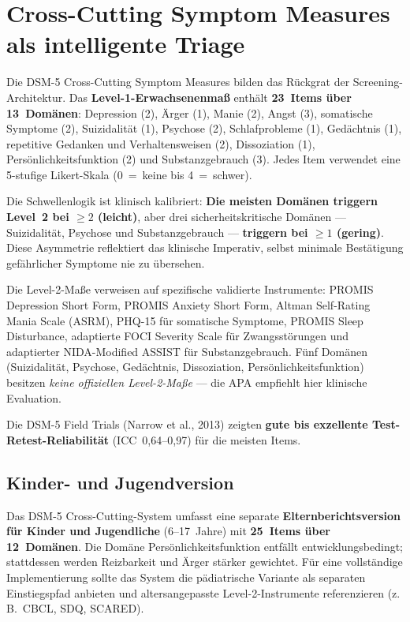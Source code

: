 \documentclass[11pt,a4paper]{article}
\begin{document}
\section{Cross-Cutting Symptom Measures als intelligente Triage}
\label{sec:screening}

Die DSM-5 Cross-Cutting Symptom Measures bilden das R\"uckgrat der Screening-Architektur. Das \textbf{Level-1-Erwachsenenma\ss{}} enth\"alt \textbf{23~Items \"uber 13~Dom\"anen}: Depression (2), \"Arger (1), Manie (2), Angst (3), somatische Symptome (2), Suizidalit\"at (1), Psychose (2), Schlafprobleme (1), Ged\"achtnis (1), repetitive Gedanken und Verhaltensweisen (2), Dissoziation (1), Pers\"onlichkeitsfunktion (2) und Substanzgebrauch (3). Jedes Item verwendet eine 5-stufige Likert-Skala (0~=~keine bis 4~=~schwer).

Die Schwellenlogik ist klinisch kalibriert: \textbf{Die meisten Dom\"anen triggern Level~2 bei $\geq 2$ (leicht)}, aber drei sicherheitskritische Dom\"anen --- Suizidalit\"at, Psychose und Substanzgebrauch --- \textbf{triggern bei $\geq 1$ (gering)}. Diese Asymmetrie reflektiert das klinische Imperativ, selbst minimale Best\"atigung gef\"ahrlicher Symptome nie zu \"ubersehen.

Die Level-2-Ma\ss{}e verweisen auf spezifische validierte Instrumente: PROMIS Depression Short Form, PROMIS Anxiety Short Form, Altman Self-Rating Mania Scale (ASRM), PHQ-15 f\"ur somatische Symptome, PROMIS Sleep Disturbance, adaptierte FOCI Severity Scale f\"ur Zwangsst\"orungen und adaptierter NIDA-Modified ASSIST f\"ur Substanzgebrauch. F\"unf Dom\"anen (Suizidalit\"at, Psychose, Ged\"achtnis, Dissoziation, Pers\"onlichkeitsfunktion) besitzen \textit{keine offiziellen Level-2-Ma\ss{}e} --- die APA empfiehlt hier klinische Evaluation.

Die DSM-5 Field Trials (Narrow et al., 2013) zeigten \textbf{gute bis exzellente Test-Retest-Reliabilit\"at} (ICC~0,64--0,97) f\"ur die meisten Items.

\subsection{Kinder- und Jugendversion}

Das DSM-5 Cross-Cutting-System umfasst eine separate \textbf{Elternberichtsversion f\"ur Kinder und Jugendliche} (6--17~Jahre) mit \textbf{25~Items \"uber 12~Dom\"anen}. Die Dom\"ane \glqq Pers\"onlichkeitsfunktion\grqq{} entf\"allt entwicklungsbedingt; stattdessen werden Reizbarkeit und \"Arger st\"arker gewichtet. F\"ur eine vollst\"andige Implementierung sollte das System die p\"adiatrische Variante als separaten Einstiegspfad anbieten und altersangepasste Level-2-Instrumente referenzieren (z.\,B.\ CBCL, SDQ, SCARED).
\end{document}
